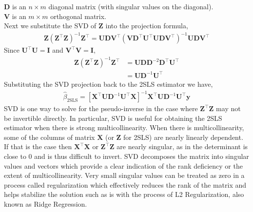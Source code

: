 \(\mathbf{D}\) is an \(n \times m\) diagonal matrix (with singular values on the diagonal). \\
\(\mathbf{V}\) is an \(m \times m\) orthogonal matrix. \\
Next we substitute the SVD of \(\mathbf{Z}\) into the projection formula,
\begin{align}
\mathbf{Z} (\mathbf{Z}^\top \mathbf{Z})^{-1} \mathbf{Z}^\top = \mathbf{U} \mathbf{D} \mathbf{V}^\top \left(\mathbf{V} \mathbf{D}^\top \mathbf{U}^\top \mathbf{U} \mathbf{D} \mathbf{V}^\top\right)^{-1} \mathbf{U} \mathbf{D} \mathbf{V}^\top
\end{align}
Since \(\mathbf{U}^\top \mathbf{U} = \mathbf{I}\) and \(\mathbf{V}^\top \mathbf{V} = \mathbf{I}\),
\begin{align}
\mathbf{Z} (\mathbf{Z}^\top \mathbf{Z})^{-1} \mathbf{Z}^\top &= \mathbf{U} \mathbf{D} \mathbf{D}^{-2} \mathbf{D}^\top \mathbf{U}^\top \\
&= \mathbf{U} \mathbf{D}^{-1} \mathbf{U}^\top
\end{align}
Substituting the SVD projection back to the 2SLS estimator we have,
\begin{align}
\hat{\beta}_{\text{2SLS}} = \left[\mathbf{X}^\top \mathbf{U} \mathbf{D}^{-1} \mathbf{U}^\top \mathbf{X}\right]^{-1} \mathbf{X}^\top \mathbf{U} \mathbf{D}^{-1} \mathbf{U}^\top \mathbf{y}
\end{align}
SVD is one way to solve for the pseudo-inverse in the case where \(\mathbf{Z}^\top \mathbf{Z}\) may not be invertible directly. In particular, SVD is useful for obtaining the 2SLS estimator when there is strong multicollinearity. When there is multicollinearity, some of the columns of matrix \(\mathbf{X}\) (or \(\mathbf{Z}\) for 2SLS) are nearly linearly dependent. If that is the case then \(\mathbf{X}^\top \mathbf{X}\) or \(\mathbf{Z}^\top \mathbf{Z}\) are nearly singular, as in the determinant is close to 0 and is thus difficult to invert. SVD decomposes the matrix into singular values and vectors which provide a clear indication of the rank deficiency or the extent of multicollinearity. Very small singular values can be treated as zero in a process called regularization which effectively reduces the rank of the matrix and helps stabilize the solution such as is with the process of L2 Regularization, also known as Ridge Regression.